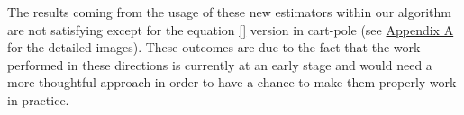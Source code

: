 The results coming from the usage of these new estimators within our algorithm are not satisfying except for the equation \ref{} version in cart-pole (see \hyperref[chap:appendix]{Appendix A} for the detailed images). These outcomes are due to the fact that the work performed in these directions is currently at an early stage and would need a more thoughtful approach in order to have a chance to make them properly work in practice.

\vspace{-0.05in}